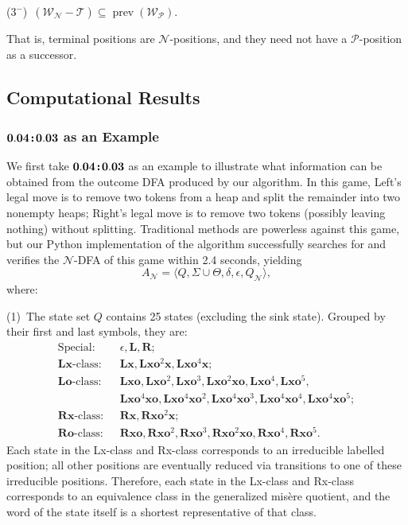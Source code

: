 \documentclass[11pt]{article}
\theoremstyle{definition}
\theoremstyle{plain}
\newcommand{\varP}{\mathcal{P}}
\newcommand{\varN}{\mathcal{N}}
\newcommand{\rmL}{\mathbf{L}}
\newcommand{\rmR}{\mathbf{R}}
\newcommand{\x}{\mathbf{x}}
\newcommand{\e}{\mathbf{o}}
\newcommand{\varW}{\mathcal{W}}
\newcommand{\varT}{\mathcal{T}}
\newcommand{\prv}{\operatorname{prev}}
\newcommand{\col}{\textbf{\;\!:\!\;}}
\begin{document}
($3^-$)~$(\varW_{\varN} - \varT) \subseteq \prv(\varW_{\varP})$.

That is, terminal positions are $\varN$-positions, and they need not have a $\varP$-position as a successor.

\subsection{Computational Results}

\subsubsection{$\mathbf{0.04\col0.03}$ as an Example}

We first take $\mathbf{0.04\col0.03}$ as an example to illustrate what information can be obtained from the outcome DFA produced by our algorithm.
In this game, Left's legal move is to remove two tokens from a heap and split the remainder into two nonempty heaps; Right's legal move is to remove two tokens (possibly leaving nothing) without splitting.
Traditional methods are powerless against this game, but our Python implementation of the algorithm successfully searches for and verifies the $\varN$-DFA of this game within 2.4 seconds, yielding
\[
    A_{\varN}=\langle Q, \varSigma \cup \varTheta, \delta, \epsilon, Q_{\varN} \rangle,
\]
where:

(1)~The state set $Q$ contains 25 states (excluding the sink state). Grouped by their first and last symbols, they are:
\small
\begin{align*}
    \text{Special:~~}  & \epsilon, \rmL, \rmR; \\
    \text{$\rmL\x$-class:~~} & \rmL\x, \rmL\x\e^2\x, \rmL\x\e^4\x; \\
    \text{$\rmL\e$-class:~~} & \rmL\x\e, \rmL\x\e^2, \rmL\x\e^3, \rmL\x\e^2\x\e, \rmL\x\e^4, \rmL\x\e^5, \\
                   & \rmL\x\e^4\x\e, \rmL\x\e^4\x\e^2, \rmL\x\e^4\x\e^3, \rmL\x\e^4\x\e^4, \rmL\x\e^4\x\e^5; \\
    \text{$\rmR\x$-class:~~} & \rmR\x, \rmR\x\e^2\x; \\
    \text{$\rmR\e$-class:~~} & \rmR\x\e, \rmR\x\e^2, \rmR\x\e^3, \rmR\x\e^2\x\e, \rmR\x\e^4, \rmR\x\e^5.
\end{align*}
\normalsize
Each state in the Lx-class and Rx-class corresponds to an irreducible labelled position; all other positions are eventually reduced via transitions to one of these irreducible positions.
Therefore, each state in the Lx-class and Rx-class corresponds to an equivalence class in the generalized misère quotient, and the word of the state itself is a shortest representative of that class.
\end{document}
